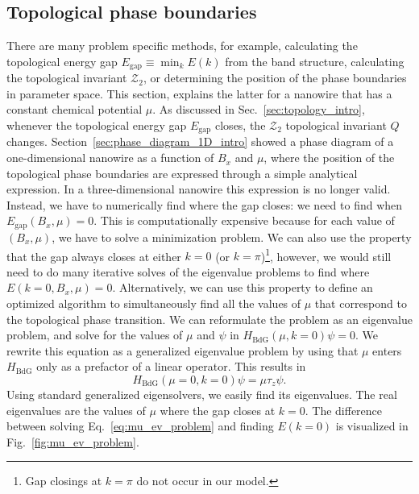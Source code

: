 \subsection{Topological phase boundaries}
There are many problem specific methods, for example, calculating the topological energy gap $E_\textrm{gap} \equiv \min_k E(k)$ from the band structure, calculating the topological invariant $\mathcal{Z}_2$, or determining the position of the phase boundaries in parameter space.
This section, explains the latter for a nanowire that has a constant chemical potential $\mu$.
As discussed in Sec.~\ref{sec:topology_intro}, whenever the topological energy gap $E_\textrm{gap}$ closes, the $\mathcal{Z}_2$ topological invariant $Q$ changes.
Section~\ref{sec:phase_diagram_1D_intro} showed a phase diagram of a one-dimensional nanowire as a function of $B_x$ and $\mu$, where the position of the topological phase boundaries are expressed through a simple analytical expression.
In a three-dimensional nanowire this expression is no longer valid.
Instead, we have to numerically find where the gap closes: we need to find when $E_\textrm{gap}(B_x, \mu) = 0$.
This is computationally expensive because for each value of $(B_x, \mu)$, we have to solve a minimization problem.
We can also use the property that the gap always closes at either $k=0$ (or $k=\pi$)\footnote{Gap closings at $k=\pi$ do not occur in our model.}, however, we would still need to do many iterative solves of the eigenvalue problems to find where $E(k=0, B_x, \mu)=0$.
Alternatively, we can use this property to define an optimized algorithm to simultaneously find all the values of $\mu$ that correspond to the topological phase transition.
We can reformulate the problem as an eigenvalue problem, and solve for the values of $\mu$ and $\psi$ in $H_\textrm{BdG}(\mu, k=0)\psi=0$.
We rewrite this equation as a generalized eigenvalue problem by using that $\mu$ enters $H_\textrm{BdG}$ only as a prefactor of a linear operator.
This results in
\begin{equation}
H_\textrm{BdG}(\mu=0, k=0)\psi = \mu \tau_z \psi.\label{eq:mu_ev_problem}
\end{equation}
Using standard generalized eigensolvers, we easily find its eigenvalues.
The real eigenvalues are the values of $\mu$ where the gap closes at $k = 0$.
The difference between solving Eq.~\eqref{eq:mu_ev_problem} and finding $E(k=0)$ is visualized in Fig.~\ref{fig:mu_ev_problem}.

